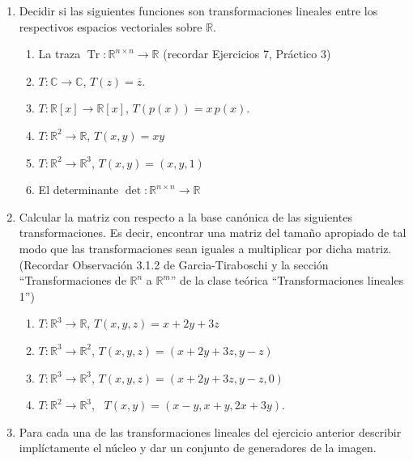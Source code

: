 \documentclass[12pt]{amsart}
\begin{document}
\begin{enumerate}[resume, topsep=5pt,itemsep=5pt]
\item Decidir si las siguientes funciones son transformaciones lineales entre los respectivos espacios vectoriales sobre $\mathbb{R}$.
\begin{enumerate}[resume, topsep=5pt,itemsep=5pt]
 \item La traza $\operatorname{Tr}:\mathbb{R}^{n\times n}\longrightarrow\mathbb{R}$ (recordar Ejercicios 7, Pr\'actico 3) 
 \item $T:\mathbb{C}\longrightarrow\mathbb{C}$, $T(z)=\overline{z}$.
 \item $T:\mathbb{R}[x]\longrightarrow\mathbb{R}[x]$, $T(p(x))=x\,p(x)$.
 \item $T:\mathbb{R}^2\longrightarrow\mathbb{R}$, $T(x,y)=xy$
 \item $T:\mathbb{R}^2\longrightarrow\mathbb{R}^3$, $T(x,y)=(x,y,1)$
 \item El determinante $\operatorname{det}:\mathbb{R}^{n\times n}\longrightarrow\mathbb{R}$
\end{enumerate}

\item Calcular la matriz con respecto a la base can\'onica de las siguientes transformaciones. Es decir, encontrar una matriz del tama\~no apropiado de tal modo que las transformaciones sean iguales a multiplicar por dicha matriz. (Recordar Observaci\'on 3.1.2 de Garcia-Tiraboschi y la secci\'on ``Transformaciones de $\mathbb{R}^n$ a $\mathbb{R}^m$'' de la clase te\'orica ``Transformaciones lineales 1'')
\begin{enumerate}[topsep=5pt,itemsep=5pt]
 \item $T:\mathbb{R}^3\longrightarrow\mathbb{R}$, $T(x,y,z)=x+2y+3z$
 \item $T:\mathbb{R}^3\longrightarrow\mathbb{R}^2$, $T(x,y,z)=(x+2y+3z, y-z)$
 \item $T:\mathbb{R}^3\longrightarrow\mathbb{R}^3$, $T(x,y,z)=(x+2y+3z, y-z,0)$
 \item $T:\mathbb{R}^2 \longrightarrow \mathbb{R}^3$, \ $T(x,y)=(x-y,x+y,2x+3y)$.
\end{enumerate}

\item Para cada una de las transformaciones lineales del ejercicio anterior describir impl\'ictamente el n\'ucleo y dar un conjunto de generadores de la imagen.


\end{enumerate}
\end{document}

